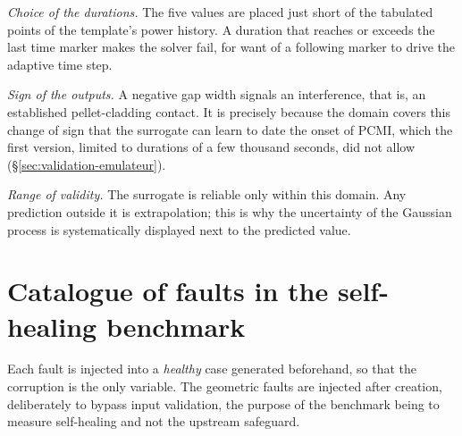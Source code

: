 \vspace{0.4cm}
\noindent
\textit{Choice of the durations.} The five values are placed just short of the
tabulated points of the template's power history. A duration that reaches or
exceeds the last time marker makes the solver fail, for want of a following
marker to drive the adaptive time step.

\vspace{0.3cm}
\noindent
\textit{Sign of the outputs.} A negative gap width signals an interference, that
is, an established pellet-cladding contact. It is precisely because the domain
covers this change of sign that the surrogate can learn to date the onset of
PCMI, which the first version, limited to durations of a few thousand seconds,
did not allow (§\ref{sec:validation-emulateur}).

\vspace{0.3cm}
\noindent
\textit{Range of validity.} The surrogate is reliable only within this domain.
Any prediction outside it is extrapolation; this is why the uncertainty of the
Gaussian process is systematically displayed next to the predicted value.

\section{Catalogue of faults in the self-healing benchmark}
\label{ann:bench}

\noindent Each fault is injected into a \emph{healthy} case generated
beforehand, so that the corruption is the only variable. The geometric faults
are injected after creation, deliberately to bypass input validation, the
purpose of the benchmark being to measure self-healing and not the upstream
safeguard.

